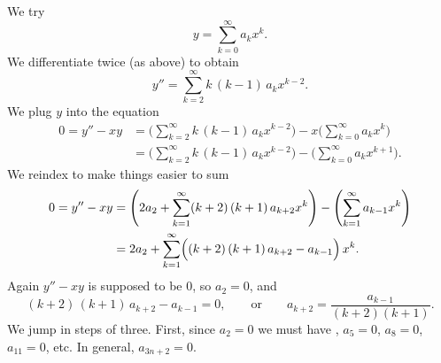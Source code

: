 \documentclass{ximera}
\begin{document}
\begin{exampleSol}
    We try
    \begin{equation*}
        y = \sum_{k=0}^\infty a_k x^k .
    \end{equation*}
    We differentiate twice (as above) to obtain
    \begin{equation*}
        y'' = \sum_{k=2}^\infty k\,(k-1) \, a_k x^{k-2} .
    \end{equation*}
    We plug $y$ into the equation
    \begin{equation*}
        \begin{split}
            0 = y''-xy &=  \Biggl( \sum_{k=2}^\infty k\,(k-1) \, a_k x^{k-2}  \Biggr) - x \Biggl( \sum_{k=0}^\infty a_k x^k \Biggr) \\
            &= \Biggl( \sum_{k=2}^\infty k\,(k-1) \, a_k x^{k-2}  \Biggr) - \Biggl( \sum_{k=0}^\infty a_k x^{k+1} \Biggr) .
        \end{split}
    \end{equation*}
    We reindex to make things easier to sum
    \begin{equation*}
    \begin{split}
        0 = y''-xy
        &= \Biggl( 2 a_2 + \sum_{k=1}^\infty (k+2)\,(k+1) \, a_{k+2} x^k  \Biggr) - \Biggl( \sum_{k=1}^\infty a_{k-1} x^k \Biggr) \\
        &= 2 a_2 +  \sum_{k=1}^\infty \Bigl( (k+2)\,(k+1) \, a_{k+2} - a_{k-1} \Bigr) \, x^k .
    \end{split}
    \end{equation*}
    Again $y''-xy$ is supposed to be 0, so $a_2 = 0$, and
    \begin{equation*}
        (k+2)\,(k+1) \,a_{k+2} - a_{k-1} = 0 ,
        \qquad \text{or} \qquad
        a_{k+2} = \frac{a_{k-1}}{(k+2)(k+1)} .
    \end{equation*}
    We jump in steps of three.  First, since $a_2 = 0$ we must have , $a_5 = 0$, $a_8 = 0$, $a_{11}=0$, etc. In general, $a_{3n+2} = 0$.
    

\end{exampleSol}
\end{document}
